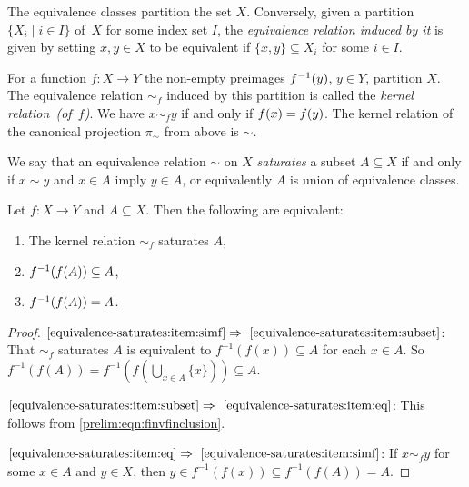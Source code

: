 The equivalence classes partition the set $X$. Conversely, given a partition $\{ X_i \mid i \in I\}$ of~$X$
for some index set $I$, the \emph{equivalence relation induced by it} is given by setting $x,y \in X$ to be equivalent
if $\{x,y\} \subseteq X_i$ for some $i \in I$. 

For a function $f \colon X \to Y$
the non-empty preimages $\applyfunc{y}{f^{-1}}$, $y \in Y$,
partition $X$. The equivalence relation $\sim_f$ \label{def:kernel}
induced by this partition is called the \emph{kernel relation~(of~$f$)}. We have 
$x \sim_f y$ if and only if $\applyfunc{x}{f} = \applyfunc{y}{f}$.
The kernel relation of the canonical projection $\pi_{\sim}$ from above is $\sim$.

We say that an equivalence relation $\sim$ on $X$ \emph{saturates} 
a subset $A \subseteq X$ if and only
if $x \sim y$ and $x \in A$ imply $y \in A$, or equivalently $A$ is union of equivalence classes.

\begin{proposition} \label{prelim:prop:equivalence-saturates}
	Let $f \colon X \to Y$ and $A \subseteq X$. 
	Then the following are equivalent:
\begin{enumerate}
\item \label{equivalence-saturates:item:simf} The kernel relation $\sim_f$ saturates $A$,

\item \label{equivalence-saturates:item:subset} $\applyfunc{\applyfunc{A}{f}}{f^{-1}} \subseteq A$,

\item \label{equivalence-saturates:item:eq} $\applyfunc{\applyfunc{A}{f}}{f^{-1}} = A$.
	
\end{enumerate}
\end{proposition}
\begin{proof}	
$\ref{equivalence-saturates:item:simf} \Rightarrow~\ref{equivalence-saturates:item:subset}$: That $\sim_f$ saturates $A$
 is equivalent to $f^{-1}(f(x)) \subseteq A$ for each $x \in A$.
 So $f^{-1}(f(A)) = f^{-1}(f(\bigcup_{x \in A} \{x\})) \subseteq A$.
 

$\ref{equivalence-saturates:item:subset} \Rightarrow~\ref{equivalence-saturates:item:eq}$: This 
follows from \cref{prelim:eqn:finvfinclusion}.
 
 
$\ref{equivalence-saturates:item:eq} \Rightarrow~\ref{equivalence-saturates:item:simf}$: If $x \sim_f y$ for some $x \in A$ and $y \in X$,
then $y \in f^{-1}(f(x)) \subseteq f^{-1}(f(A)) = A$.	
\end{proof} 

